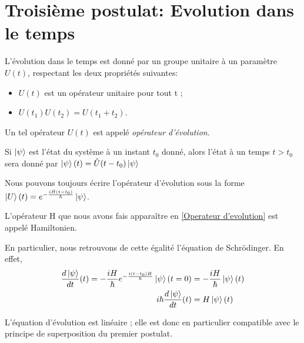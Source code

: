 \documentclass[../notesdecours.tex]{subfiles}
\begin{document}
    \section{Troisième postulat: Evolution dans le temps}

    \begin{definition}
        L'évolution dans le temps est donné par un groupe unitaire à un paramètre $U(t)$, respectant les deux propriétés suivantes:
        \begin{itemize}
            \item $U(t)$ est un opérateur unitaire pour tout t ;
            \item $U(t_1)U(t_2)=U(t_1+t_2)$.
        \end{itemize}
        Un tel opérateur $U(t)$ est appelé \emph{opérateur d'évolution}.
    \end{definition}

    \begin{property}
        Si $\ket{\psi}$ est l'état du système à un instant $t_0$ donné, alors l'état à un temps $t>t_0$ sera donné par 
        \begin{math}
            \ket{\psi}(t) = \hat{U}(t-t_0)\ket{\psi}
        \end{math}
    \end{property}

    \begin{property}
        \label{Operateur d'evolution}
        Nous pouvons toujours écrire l'opérateur d'évolution sous la forme $\ket{U}(t) = e^{-\frac{i\hat{H}(t-t_0)}{\hbar}}\ket{\psi}$. 
    \end{property}

    \begin{definition}
        L'opérateur H que nous avons fais apparaître en \ref{Operateur d'evolution} est appelé Hamiltonien. 
    \end{definition}

    En particulier, nous retrouvons de cette égalité l'équation de Schrödinger. En effet,
    \begin{align}
        \frac{d\ket{\psi}}{dt} (t)= -\frac{iH}{\hbar}e^{-\frac{i(t-t_0)H}{\hbar}}\ket{\psi}(t=0) &= -\frac{iH}{\hbar}\ket{\psi}(t)\\
        i\hbar\frac{d\ket{\psi}}{dt} (t) &= H\ket{\psi}(t) \label{Schrodinger}
    \end{align}

    \begin{remark}
        L'équation d'évolution est linéaire ; elle est donc en particulier compatible avec le principe de superposition du premier postulat.
    \end{remark}
\end{document}
